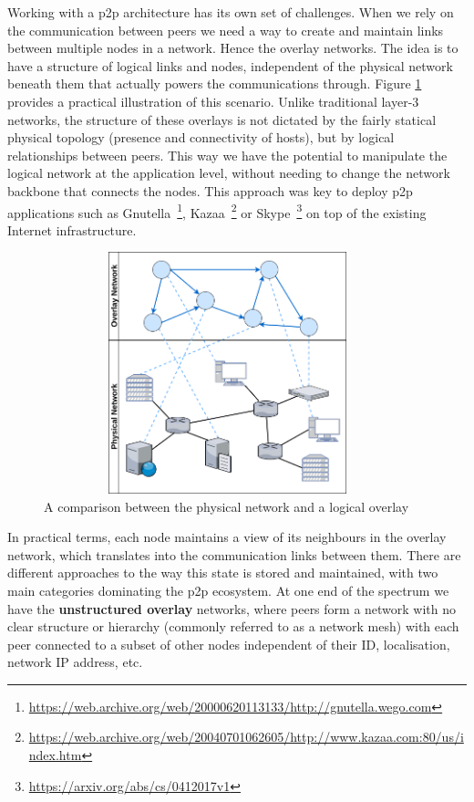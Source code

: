 Working with a \acrshort{p2p} architecture has its own set of challenges. When
we rely on the communication between peers we need a way to create and maintain
links between multiple nodes in a network. Hence the overlay networks. The idea
is to have a structure of logical links and nodes, independent of the physical
network beneath them that actually powers the communications through. Figure
\ref{fig:overlay-vs-physical} provides a practical illustration of this
scenario. Unlike traditional layer-3 networks, the structure of these overlays
is not dictated by the fairly statical physical topology (presence and
connectivity of hosts), but by logical relationships between peers. This way we
have the potential to manipulate the logical network at the application level,
without needing to change the network backbone that connects the nodes. This
approach was key to deploy \acrshort{p2p} applications such as
Gnutella~\footnote{\url{https://web.archive.org/web/20000620113133/http://gnutella.wego.com}},
Kazaa~\footnote{\url{https://web.archive.org/web/20040701062605/http://www.kazaa.com:80/us/index.htm}}
or Skype~\footnote{\url{https://arxiv.org/abs/cs/0412017v1}} on top of the
existing Internet infrastructure.

\begin{figure}[hb!]
  \centering
  \includegraphics[max height=7cm,max width=0.95\textwidth]{img/overlay-vs-physical.png}
  \caption{A comparison between the physical network and a logical overlay}
  \label{fig:overlay-vs-physical}
\end{figure}

In practical terms, each node maintains a view of its neighbours in the
overlay network, which translates into the communication links between
them. There are different approaches to the way this state is stored and
maintained, with two main categories dominating the \acrshort{p2p} ecosystem. At
one end of the spectrum we have the \textbf{unstructured overlay}
networks, where peers form a network with no clear structure or
hierarchy (commonly referred to as a network mesh) with each peer
connected to a subset of other nodes independent of their ID,
localisation, network IP address, etc.
\bigskip

